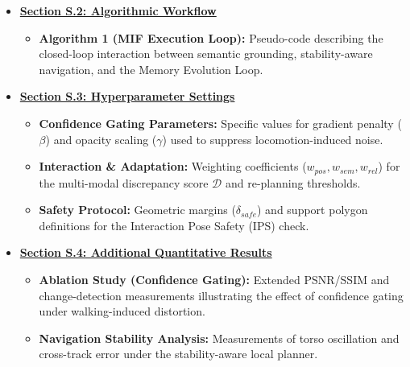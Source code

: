 \documentclass[conference]{IEEEtran}
\begin{document}
\begin{strip}
\begin{center}
\begin{minipage}{0.96\textwidth}
\begin{itemize}
    \item \textbf{\hyperref[sec:algo_workflow]{Section S.2: Algorithmic Workflow}}
    \begin{itemize} \setlength{\itemsep}{1pt} \setlength{\topsep}{0pt} \small
        \item \textbf{Algorithm 1 (MIF Execution Loop):} Pseudo-code describing the closed-loop interaction between semantic grounding, stability-aware navigation, and the Memory Evolution Loop.
    \end{itemize}

    \item \textbf{\hyperref[sec:hyperparameters]{Section S.3: Hyperparameter Settings}}
    \begin{itemize} \setlength{\itemsep}{1pt} \setlength{\topsep}{0pt} \small
        \item \textbf{Confidence Gating Parameters:} Specific values for gradient penalty ($\beta$) and opacity scaling ($\gamma$) used to suppress locomotion-induced noise.
        \item \textbf{Interaction \& Adaptation:} Weighting coefficients ($w_{pos}, w_{sem}, w_{rel}$) for the multi-modal discrepancy score $\mathcal{D}$ and re-planning thresholds.
        \item \textbf{Safety Protocol:} Geometric margins ($\delta_{safe}$) and support polygon definitions for the Interaction Pose Safety (IPS) check.
    \end{itemize}

    \item \textbf{\hyperref[sec:add_experiments]{Section S.4: Additional Quantitative Results}}
    \begin{itemize} \setlength{\itemsep}{1pt} \setlength{\topsep}{0pt} \small
        \item \textbf{Ablation Study (Confidence Gating):} Extended PSNR/SSIM and change-detection measurements illustrating the effect of confidence gating under walking-induced distortion.
        \item \textbf{Navigation Stability Analysis:} Measurements of torso oscillation and cross-track error under the stability-aware local planner.
    \end{itemize}


\end{itemize}
\end{minipage}
\end{center}
\end{strip}
\end{document}

